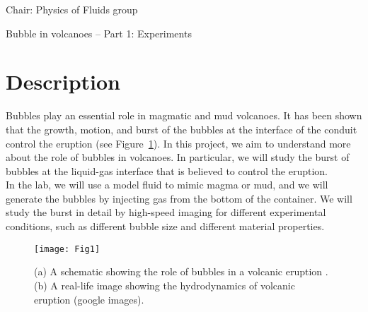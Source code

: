 \documentclass[a4paper,10pt]{article}
\begin{document}
\noindent Chair: Physics of Fluids group
\begin{center}
 \begin{LARGE}
  Bubble in volcanoes -- Part 1: Experiments
 \end{LARGE}
\end{center}
\section*{Description}
Bubbles play an essential role in magmatic and mud volcanoes. It has been shown that the growth, motion, and burst of the bubbles at the interface of the conduit control the eruption (see Figure~\ref{Figure::Typical}). In this project, we aim to understand more about the role of bubbles in volcanoes. In particular, we will study the burst of bubbles at the liquid-gas interface that is believed to control the eruption.\\
In the lab, we will use a model fluid to mimic magma or mud, and we will generate the bubbles by injecting gas from the bottom of the container. We will study the burst in detail by high-speed imaging for different experimental conditions, such as different bubble size and different material properties.
\begin{figure}[H]
\begin{center}
 \texttt{[image: Fig1]}
 \caption{(a) A schematic showing the role of bubbles in a volcanic eruption \citep{gonnermann2007fluid}. (b) A real-life image showing the hydrodynamics of volcanic eruption (google images).}
 \label{Figure::Typical}
\end{center}
\end{figure}
\end{document}
